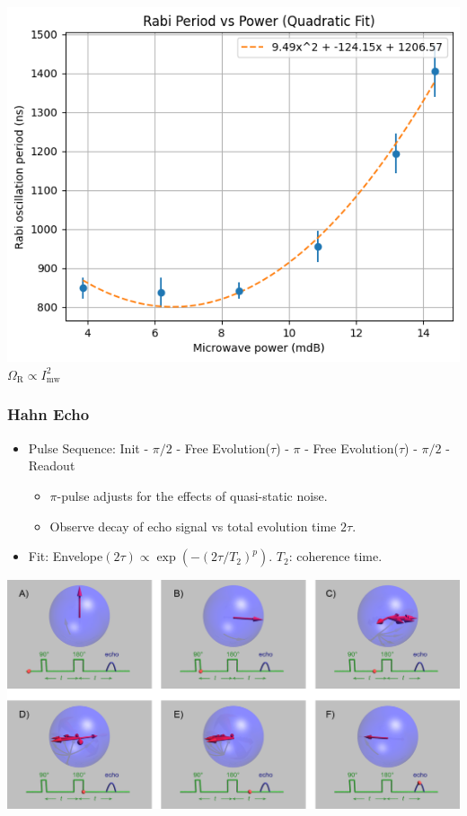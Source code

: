 \documentclass{beamer}
\begin{document}
\begin{frame}{}
    \vspace{1em} %

    \begin{minipage}{0.5\textwidth}
        \centering
        \includegraphics[width=\linewidth]{presentation/figs/period_vs_power.png} \\
        {\small $ \Omega_\text{R} \propto I_\text{mw}^2$}
    \end{minipage}
\end{frame}
\begin{frame}
\frametitle{Hahn Echo}
\begin{itemize}
    \item Pulse Sequence: Init - $\pi/2$ - Free Evolution($\tau$) - $\pi$ - Free Evolution($\tau$) - $\pi/2$ - Readout
    \begin{itemize}
        \item $\pi$-pulse adjusts for the effects of quasi-static noise. 
        \item Observe decay of echo signal vs total evolution time $2\tau$.
    \end{itemize}
    \item Fit: Envelope$(2\tau) \propto \exp(-(2\tau/T_2)^p)$. $T_2$: coherence time. 
\end{itemize}
    \centering
    \includegraphics[width=\linewidth]{presentation/figs/hahn_wiki.jpg}\
\end{frame}
\end{document}
